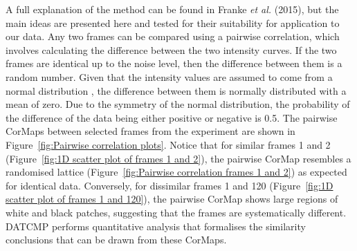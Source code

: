 A full explanation of the method can be found in Franke \textit{et al.} (2015), but the main ideas are presented here and tested for their suitability for application to our data.
Any two frames can be compared using a pairwise correlation, which involves calculating the difference between the two intensity curves.
If the two frames are identical up to the noise level, then the difference between them is a random number.
Given that the intensity values are assumed to come from a normal distribution \cite{franke2015correlation}, the difference between them is normally distributed with a mean of zero.
Due to the symmetry of the normal distribution, the probability of the difference of the data being either positive or negative is 0.5.
The pairwise CorMaps between selected frames from the experiment are shown in Figure~\ref{fig:Pairwise correlation plots}.
Notice that for similar frames 1 and 2 (Figure~\ref{fig:1D scatter plot of frames 1 and 2}), the pairwise CorMap resembles a randomised lattice (Figure~\ref{fig:Pairwise correlation frames 1 and 2}) as expected for identical data.
Conversely, for dissimilar frames 1 and 120 (Figure~\ref{fig:1D scatter plot of frames 1 and 120}), the pairwise CorMap shows large regions of white and black patches, suggesting that the frames are systematically different.
DATCMP performs quantitative analysis that formalises the similarity conclusions that can be drawn from these CorMaps.
